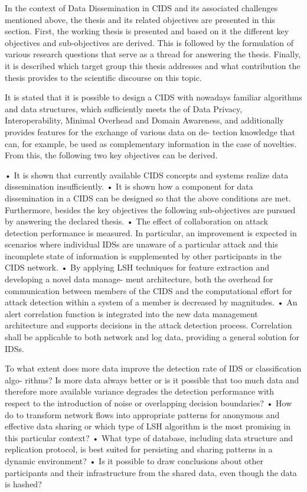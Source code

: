 \documentclass[../../main.tex]{subfiles}
\begin{document}
In the context of Data Dissemination in CIDS and its associated challenges mentioned above,
the thesis and its related objectives are presented in this section. First, the working thesis is
presented and based on it the different key objectives and sub-objectives are derived. This is
followed by the formulation of various research questions that serve as a thread for answering
the thesis. Finally, it is described which target group this thesis addresses and what contribution
the thesis provides to the scientific discourse on this topic.

It is stated that it is possible to design a CIDS with nowadays familiar algorithms and data
structures, which sufficiently meets the of Data Privacy, Interoperability, Minimal Overhead and
Domain Awareness, and additionally provides features for the exchange of various data on de-
tection knowledge that can, for example, be used as complementary information in the case of
novelties. From this, the following two key objectives can be derived.

• It is shown that currently available CIDS concepts and systems realize data dissemination
insufficiently.
• It is shown how a component for data dissemination in a CIDS can be designed so that
the above conditions are met.
Furthermore, besides the key objectives the following sub-objectives are pursued by answering
the declared thesis.
• The effect of collaboration on attack detection performance is measured. In particular, an
improvement is expected in scenarios where individual IDSs are unaware of a particular
attack and this incomplete state of information is supplemented by other participants in
the CIDS network.
• By applying LSH techniques for feature extraction and developing a novel data manage-
ment architecture, both the overhead for communication between members of the CIDS
and the computational effort for attack detection within a system of a member is decreased
by magnitudes.
• An alert correlation function is integrated into the new data management architecture and
supports decisions in the attack detection process. Correlation shall be applicable to both
network and log data, providing a general solution for IDSs.

To what extent does more data improve the detection rate of IDS or classification algo-
rithms? Is more data always better or is it possible that too much data and therefore more
available variance degrades the detection performance with respect to the introduction of
noise or overlapping decision boundaries?
• How do to transform network flows into appropriate patterns for anonymous and effective
data sharing or which type of LSH algorithm is the most promising in this particular
context?
• What type of database, including data structure and replication protocol, is best suited
for persisting and sharing patterns in a dynamic environment?
• Is it possible to draw conclusions about other participants and their infrastructure from
the shared data, even though the data is hashed?
\end{document}
